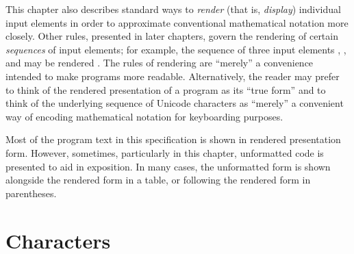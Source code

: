 This chapter also describes standard ways
to \emph{render} (that is, \emph{display}) individual input elements
in order to approximate conventional mathematical notation more closely.
Other rules, presented in later chapters, govern the rendering of
certain \emph{sequences} of input elements; for example,
the sequence of three input elements
, , and  may be rendered .
The rules of rendering are ``merely'' a convenience intended
to make programs more readable.  Alternatively, the reader may prefer
to think of the rendered presentation of a program as its ``true form''
and to think of the underlying sequence of Unicode characters
as ``merely'' a convenient way of encoding mathematical
notation for keyboarding purposes.

Most of the program text in this specification
is shown in rendered presentation form.
However, sometimes, particularly in this chapter,
unformatted code is presented to aid in exposition.
In many cases, the unformatted form is shown alongside
the rendered form in a table,
or following the rendered form in parentheses.

\section{Characters}

